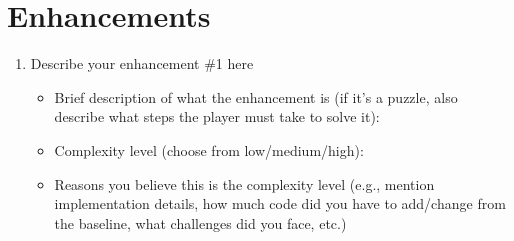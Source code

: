 \documentclass[11pt]{article}
\begin{document}
\section*{Enhancements}
\begin{enumerate}
    \item Describe your enhancement \#1 here
    \begin{itemize}
        \item Brief description of what the enhancement is (if it's a puzzle, also describe what steps the player must take to solve it):
        \item Complexity level (choose from low/medium/high):
        \item Reasons you believe this is the complexity level (e.g., mention implementation details, how much code did you have to add/change from the baseline, what challenges did you face, etc.)
    \end{itemize}

\end{enumerate}
\end{document}
